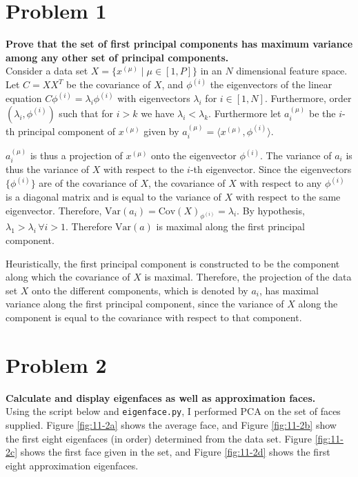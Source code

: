 \documentclass[aps,letterpaper,10pt]{article}
\newcommand{\ttt}{\texttt}
\begin{document}
\section{Problem 1}
\textbf{Prove that the set of first principal components has maximum variance among any other set of principal components.}\\

Consider a data set $X=\{x^{(\mu)} \mid \mu\in[1,P]\}$ in an $N$ dimensional feature space. Let $C=XX^T$ be the covariance of $X$, and $\phi^{(i)}$ the eigenvectors of the linear equation $C\phi^{(i)} = \lambda_i\phi^{(i)}$ with eigenvectors $\lambda_i$ for $i\in[1,N]$. Furthermore, order $(\lambda_i, \phi^{(i)})$ such that for $i>k$ we have $\lambda_i<\lambda_k$. Furthermore let $a_i^{(\mu)}$ be the $i$-th principal component of $x^{(\mu)}$ given by $a_i^{(\mu)} = \langle{x^{(\mu)}, \phi^{(i)}}\rangle$.

$a_i^{(\mu)}$ is thus a projection of $x^{(\mu)}$ onto the eigenvector $\phi^{(i)}$. The variance of $a_i$ is thus the variance of $X$ with respect to the $i$-th eigenvector.  Since the eigenvectors $\{\phi^{(i)}\}$ are of the covariance of $X$, the covariance of $X$ with respect to any $\phi^{(i)}$ is a diagonal matrix and is equal to the variance of $X$ with respect to the same eigenvector. Therefore, $\text{Var}(a_i) = \text{Cov}(X)_{\phi^{(i)}} = \lambda_i$.  By hypothesis, $\lambda_1>\lambda_i\, \forall i>1$.  Therefore $\text{Var}(a)$ is maximal along the first principal component.

Heuristically, the first principal component is constructed to be the component along which the covariance of $X$ is maximal. Therefore, the projection of the data set $X$ onto the different components, which is denoted by $a_i$, has maximal variance along the first principal component, since the variance of $X$ along the component is equal to the covariance with respect to that component.

\newpage
\section{Problem 2}
\textbf{Calculate and display eigenfaces as well as approximation faces.}\\

Using the script below and \ttt{eigenface.py}, I performed PCA on the set of faces supplied. Figure \ref{fig:11-2a} shows the average face, and Figure \ref{fig:11-2b} show the first eight eigenfaces (in order) determined from the data set. Figure \ref{fig:11-2c} shows the first face given in the set, and Figure \ref{fig:11-2d} shows the first eight approximation eigenfaces.
\end{document}
